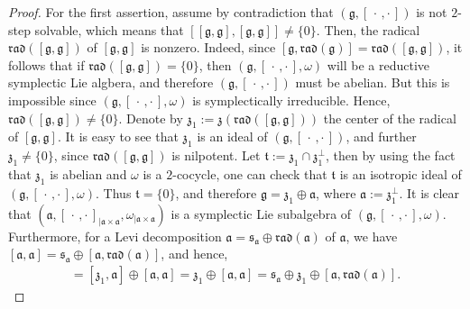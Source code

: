 \documentclass[final,1p,times,nopreprintline]{elsarticle}
\theoremstyle{definition}
\numberwithin{equation}{section}
\newcommand{\w}{\omega}
\newcommand{\g}{\mathfrak{g}}
\newcommand{\ai}{\mathfrak{a}}
\numberwithin{equation}{section}
\newcommand{\z}{\mathfrak{z}}
\newcommand{\cro}{[\,\cdot\,,\cdot\,]}
\begin{document}
\begin{proof}
	For the first assertion, assume by contradiction that $(\g,\cro)$ is not $2$-step solvable, which means that $\left[[\g,\g],[\g,\g]\right]\neq\{0\}$. Then, the radical $\mathfrak{rad}([\g,\g])$ of $[\g,\g]$ is nonzero. Indeed, since $[\g,\mathfrak{rad}(\g)]=\mathfrak{rad}([\g,\g])$, it follows that if $\mathfrak{rad}([\g,\g])=\{0\}$, then $(\g,\cro,\w)$ will be a reductive symplectic Lie algbera, and therefore $(\g,\cro)$ must be abelian. But this is impossible since $(\g,\cro,\w)$ is symplectically irreducible. Hence, $\mathfrak{rad}([\g,\g])\neq\{0\}$. Denote by $\mathfrak{z}_1:=\z\left(\mathfrak{rad}([\g,\g])\right)$ the center of the radical of $[\g,\g]$. It is easy to see that $\z_1$ is an ideal of $(\g,\cro)$, and further $\z_1\neq\{0\}$, since $\mathfrak{rad}([\g,\g])$ is nilpotent. Let $\mathfrak{t}:=\z_1\cap\z_1^\perp$, then by using the fact that $\z_1$ is abelian and $\w$ is a $2$-cocycle, one can check that $\mathfrak{t}$ is an isotropic ideal of $(\g,\cro,\w)$. Thus $\mathfrak{t}=\{0\}$, and therefore $\g=\z_1\oplus\ai$, where $\ai:=\z_1^\perp$. It is clear that $(\ai,\cro_{|\ai\times\ai},\w_{|\ai\times\ai})$ is a symplectic Lie subalgebra of $(\g,\cro,\w)$. Furthermore, for a Levi decomposition $\ai=\mathfrak{s}_\ai\oplus\mathfrak{rad}(\ai)$ of $\ai$, we have $[\ai,\ai]=\mathfrak{s}_\ai\oplus[\ai,\mathfrak{rad}(\ai)]$, and hence,
	\begin{eqnarray*}
		[\g,\g]=[\z_1,\ai]\oplus[\ai,\ai]=\z_1\oplus[\ai,\ai]=\mathfrak{s}_\ai\oplus\z_1\oplus[\ai,\mathfrak{rad}(\ai)].
	\end{eqnarray*}

\end{proof}
\end{document}
